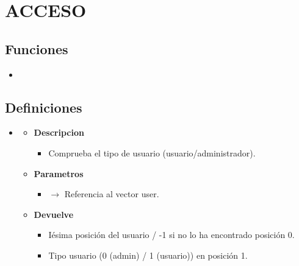 \section{ACCESO}

\subsection{Funciones}
\begin{itemize}
    \item {}
   
\end{itemize}
\subsection{Definiciones}
\begin{itemize}
    \item \label{acceder}
    \begin{itemize}
        \item \textbf{Descripcion}
        \begin{itemize}
			\item Comprueba el tipo de usuario (usuario/administrador).
		\end{itemize}
		\item \textbf{Parametros}
		\begin{itemize}
			\item {} $\rightarrow$ Referencia al vector user.
		\end{itemize}
		\item \textbf{Devuelve}
		\begin{itemize}
			\item Iésima posición del usuario / -1 si no lo ha encontrado posición 0.
			\item Tipo usuario (0 (admin) / 1 (usuario)) en posición 1.
		\end{itemize}
	\end{itemize}

\end{itemize}
